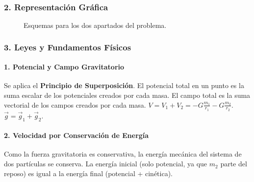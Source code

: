 \subsubsection*{2. Representación Gráfica}
\begin{figure}[H]
    \centering
    \hfill
    \caption{Esquemas para los dos apartados del problema.}
\end{figure}

\subsubsection*{3. Leyes y Fundamentos Físicos}
\paragraph*{1. Potencial y Campo Gravitatorio}
Se aplica el \textbf{Principio de Superposición}. El potencial total en un punto es la suma escalar de los potenciales creados por cada masa. El campo total es la suma vectorial de los campos creados por cada masa.
$V = V_1 + V_2 = -G\frac{m_1}{r_1} - G\frac{m_2}{r_2}$.
$\vec{g} = \vec{g}_1 + \vec{g}_2$.

\paragraph*{2. Velocidad por Conservación de Energía}
Como la fuerza gravitatoria es conservativa, la energía mecánica del sistema de dos partículas se conserva. La energía inicial (solo potencial, ya que $m_2$ parte del reposo) es igual a la energía final (potencial + cinética).

